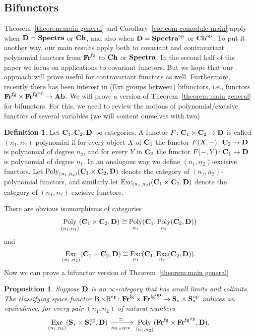 \documentclass[psamsfonts]{amsart}
\theoremstyle{plain}
\newtheorem{prop}[thm]{Proposition}
\theoremstyle{definition}
\newtheorem{defn}[thm]{Definition}
\theoremstyle{remark}
\newcommand{\catname}[1]{{\normalfont\textbf{#1}}}
\newcommand{\op}{{\mathrm{op}}}
\newcommand{\spaces}{\catname{S}_*}
\newcommand{\fr}{\allfr^{\mathrm{fg}}}
\newcommand{\allfr}{\catname{Fr}}
\newcommand{\ab}{\catname{Ab}}
\newcommand{\ch}{\catname{Ch}}
\newcommand{\classifying}{\operatorname{B}}
\DeclareMathOperator{\poly}{Poly}
\DeclareMathOperator{\exc}{Exc}
\begin{document}
\subsection*{Bifunctors}
Theorem~\ref{theorem:main general} and Corollary~\ref{cor:com comodule main} apply when $\catname{D}=\catname{Spectra}$ or $\ch$, and also when $\catname{D}={\catname{Spectra}}^{\op}$ or ${\ch}^{\op}$. To put it another way, our main results apply both to covariant and contravariant polynomial functors from $\fr$ to $\ch$ or $\catname{Spectra}$. In the second half of the paper we focus on applications to covariant functors. But we hope that our approach will prove useful for contravariant functors as well. Furthermore, recently there has been interest in (Ext groups between) bifunctors, i.e., functors $\fr\times{\fr}^{\op}\to \ab$. We will prove a version of Theorem~\ref{theorem:main general} for bifunctors. For this, we need to review the notions of polynomial/excisive functors of several variables (we will content ourselves with two)
\begin{defn}
Let $\catname{C}_1, \catname{C}_2, \catname{D}$ be categories. A functor $F\colon\catname{C}_1\times \catname{C}_2\to \catname{D}$ is called $(n_1,n_2)$-polynomial if for every object $X$ of 
$\catname{C}_1$ the functor $F(X, -)\colon \catname{C}_2\to \catname{D}$ is polynomial of degree $n_2$, and for every $Y$ in $\catname{C}_2$ the functor $F(-, Y)\colon \catname{C}_1\to \catname{D}$ is polynomial of degree $n_1$. 
In an analogous way we define $(n_1, n_2)$-excisive functors. Let $\poly_{(n_1, n_2)}(\catname{C}_1\times\catname{C}_2, \catname{D})$ denote the category of $(n_1, n_2)$-polynomial functors, and similarly let $\exc_{(n_1, n_2)}(\catname{C}_1\times\catname{C}_2, \catname{D})$ denote the category of $(n_1, n_2)$-excisive functors.
\end{defn}
There are obvious isomorphisms of categories
\[
\poly_{(n_1, n_2)}(\catname{C}_1\times\catname{C}_2, \catname{D}) \cong \poly_{n_1}(\catname{C}_1, \poly_{n_2}(\catname{C}_2, \catname{D}))
\]
and 
\[
\exc_{(n_1, n_2)}(\catname{C}_1\times\catname{C}_2, \catname{D}) \cong \exc_{n_1}(\catname{C}_1, \exc_{n_2}(\catname{C}_2, \catname{D})).
\]
Now we can prove a bifunctor version of Theorem~\ref{theorem:main general}
\begin{prop}\label{prop:bivariant}
Suppose $\catname{D}$ is an $\infty$-category that has small limits and colimits. The classifying space functor $\classifying\times{\classifying}^{\op} \colon \fr\times {\fr}^{\op}\to \spaces \times {\spaces}^{\!\!\!\op}$ induces an equivalence, for every pair $(n_1, n_2)$ of natural numbers
\[
\exc_{(n_1, n_2)}(\spaces\times {\spaces}^{\!\!\!\op}, \catname{D})\xrightarrow[\rho_{\classifying\times {\classifying}^{\op}}]{\simeq} \poly_{(n_1, n_2)}(\fr\times {\fr}^{\op}, \catname{D}).
\]
\end{prop}
\end{document}
